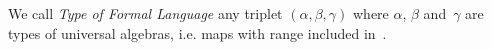 \begin{defin}\label{logic:def:type:formal:language}
We call {\em Type of Formal Language} any triplet
$(\alpha,\beta,\gamma)$ where $\alpha$, $\beta$ and~$\gamma$ are
types of universal algebras, i.e. maps with range included in~\N.
\end{defin}

